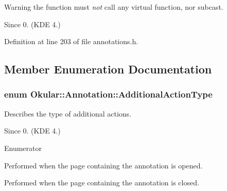 \begin{DoxyWarning}{Warning}
the function must {\itshape not} call any virtual function, nor subcast.
\end{DoxyWarning}
\begin{DoxySince}{Since}
0. (K\+D\+E 4.) 
\end{DoxySince}


Definition at line 203 of file annotations.\+h.



\subsection{Member Enumeration Documentation}
\hypertarget{classOkular_1_1Annotation_aa34152e337b1cb13e9327f37fc295057}{
\subsubsection[{Additional\+Action\+Type}]{\setlength{\rightskip}{0pt plus 5cm}enum {\bf Okular\+::\+Annotation\+::\+Additional\+Action\+Type}}}\label{classOkular_1_1Annotation_aa34152e337b1cb13e9327f37fc295057}
Describes the type of additional actions.

\begin{DoxySince}{Since}
0. (K\+D\+E 4.) 
\end{DoxySince}
\begin{Desc}
\item[Enumerator]\par
\begin{description}
\item[{\em 
\hypertarget{classOkular_1_1Annotation_aa34152e337b1cb13e9327f37fc295057a46ab9d0c7ed65157b6982a807975b7f0}{Page\+Opening}\label{classOkular_1_1Annotation_aa34152e337b1cb13e9327f37fc295057a46ab9d0c7ed65157b6982a807975b7f0}
}]Performed when the page containing the annotation is opened. \item[{\em 
\hypertarget{classOkular_1_1Annotation_aa34152e337b1cb13e9327f37fc295057a163dda71b8c9ac45ce1c250f37458bac}{Page\+Closing}\label{classOkular_1_1Annotation_aa34152e337b1cb13e9327f37fc295057a163dda71b8c9ac45ce1c250f37458bac}
}]Performed when the page containing the annotation is closed. \end{description}
\end{Desc}



